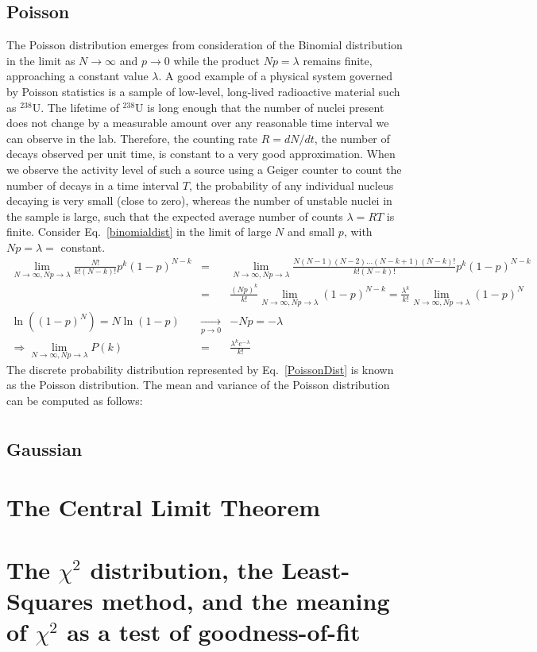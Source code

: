 \documentclass{revtex4}
\begin{document}
\subsection{Poisson}
The Poisson distribution emerges from consideration of the Binomial
distribution in the limit as $N \rightarrow \infty$ and $p \rightarrow
0$ while the product $Np = \lambda$ remains finite, approaching a
constant value $\lambda$. A good example of a physical system governed
by Poisson statistics is a sample of low-level, long-lived radioactive
material such as $^{238}$U. The lifetime of $^{238}$U is long enough
that the number of nuclei present does not change by a measurable
amount over any reasonable time interval we can observe in the
lab. Therefore, the counting rate $R = dN/dt$, the number of decays
observed per unit time, is constant to a very good approximation.  When we observe the activity level of such
a source using a Geiger counter to count the number of decays in a
time interval $T$, the probability of any individual nucleus decaying
is very small (close to zero), whereas the number of unstable nuclei
in the sample is large, such that the expected average number of counts
$\lambda = RT$ is finite. Consider Eq.~\eqref{binomialdist} in the
limit of large $N$ and small $p$, with $Np = \lambda = $ constant. 
\begin{eqnarray}
  \lim_{N \rightarrow \infty, Np \rightarrow \lambda}
  \frac{N!}{k!(N-k)!} p^k (1-p)^{N-k} &=& \lim_{N \rightarrow
    \infty,Np \rightarrow \lambda} \frac{N(N-1)(N-2)\ldots
    (N-k+1)(N-k)!}{k!(N-k)!}p^k(1-p)^{N-k} \nonumber \\
  &=& \frac{(Np)^k}{k!} \lim_{N\rightarrow \infty, Np \rightarrow \lambda} (1-p)^{N-k} =
  \frac{\lambda^k}{k!} \lim_{N\rightarrow \infty, Np\rightarrow \lambda} (1-p)^N \nonumber \\
 \ln \left((1-p)^N\right) = N \ln (1-p) &\xrightarrow[p \rightarrow 0]{}& -Np = -\lambda \nonumber \\
 \Rightarrow \lim_{N\rightarrow \infty,Np\rightarrow \lambda} P(k) &=&
 \frac{\lambda^k e^{-\lambda}}{k!} \label{PoissonDist}
\end{eqnarray}
The discrete probability distribution represented by
Eq.~\eqref{PoissonDist} is known as the Poisson distribution. The mean
and variance of the Poisson distribution can be computed as follows:
\begin{eqnarray}
\end{eqnarray}
\subsection{Gaussian}
\section{The Central Limit Theorem}
\section{The $\chi^2$ distribution, the Least-Squares method, and the
  meaning of $\chi^2$ as a test of goodness-of-fit}
\end{document}
